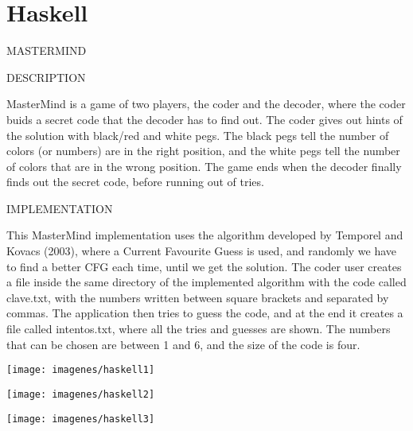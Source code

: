 
\chapter{Haskell}

MASTERMIND

DESCRIPTION

MasterMind is a game of two players, the coder and the decoder, where the coder buids a secret code that the decoder has to find out. The coder gives out hints of the solution with black/red and white pegs. The black pegs tell the number of colors (or numbers) are in the right position, and the white pegs tell the number of colors that are in the wrong position.
The game ends when the decoder finally finds out the secret code, before running out of tries.


IMPLEMENTATION

This MasterMind implementation uses the algorithm developed by \cite{2000067} Temporel and Kovacs (2003), where a Current Favourite Guess is used, and randomly we have to find a better CFG each time, until we get the solution.
The coder user creates a file inside the same directory of the implemented algorithm with the code called clave.txt, with the numbers written between square brackets and separated by commas. The application then tries to guess the code, and at the end it creates a file called intentos.txt, where all the tries and guesses are shown.
The numbers that can be chosen are between 1 and 6, and the size of the code is four.

\centerline{\texttt{[image: imagenes/haskell1]} }
\centerline{\texttt{[image: imagenes/haskell2]} }
\centerline{\texttt{[image: imagenes/haskell3]} }
